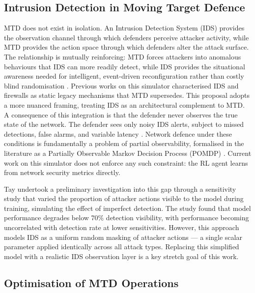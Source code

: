 \documentclass[11pt, a4paper]{article}
\begin{document}
\subsection{Intrusion Detection in Moving Target Defence}

MTD does not exist in isolation. An Intrusion Detection System (IDS) provides the observation channel through which defenders perceive attacker activity, while MTD provides the action space through which defenders alter the attack surface. The relationship is mutually reinforcing: MTD forces attackers into anomalous behaviours that IDS can more readily detect, while IDS provides the situational awareness needed for intelligent, event-driven reconfiguration rather than costly blind randomisation \cite{cho2020}. Previous works on this simulator \cite{zhang2023} characterised IDS and firewalls as static legacy mechanisms that MTD supersedes. This proposal adopts a more nuanced framing, treating IDS as an architectural complement to MTD. A consequence of this integration is that the defender never observes the true state of the network. The defender sees only noisy IDS alerts, subject to missed detections, false alarms, and variable latency \cite{khraisat2019}. Network defence under these conditions is fundamentally a problem of partial observability, formalised in the literature as a Partially Observable Markov Decision Process (POMDP) \cite{mcabee2021}. Current work on this simulator does not enforce any such constraint: the RL agent learns from network security metrics directly.

Tay \cite{tay2024} undertook a preliminary investigation into this gap through a sensitivity study that varied the proportion of attacker actions visible to the model during training, simulating the effect of imperfect detection. The study found that model performance degrades below 70\% detection visibility, with performance becoming uncorrelated with detection rate at lower sensitivities. However, this approach models IDS as a uniform random masking of attacker actions --- a single scalar parameter applied identically across all attack types. Replacing this simplified model with a realistic IDS observation layer is a key stretch goal of this work.

\subsection{Optimisation of MTD Operations}
\end{document}
